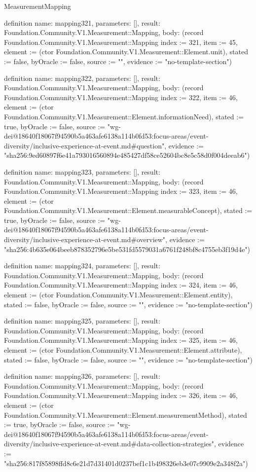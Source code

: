 \begin{lexlean}{MeasurementMapping}
\begin{semanticmodule}
definition{
  name: mapping321,
  parameters: [],
  result: Foundation.Community.V1.Measurement::Mapping,
  body: (record Foundation.Community.V1.Measurement::Mapping {index := 321, item := 45, element := (ctor Foundation.Community.V1.Measurement::Element.unit), stated := false, byOracle := false, source := "", evidence := "no-template-section"})
}

definition{
  name: mapping322,
  parameters: [],
  result: Foundation.Community.V1.Measurement::Mapping,
  body: (record Foundation.Community.V1.Measurement::Mapping {index := 322, item := 46, element := (ctor Foundation.Community.V1.Measurement::Element.informationNeed), stated := true, byOracle := false, source := "wg-dei@18640f18067f94590b5a463afe6138a114b0fd53:focus-areas/event-diversity/inclusive-experience-at-event.md#question", evidence := "sha256:9ed60897f6e41a793016560894e485427df58ce52604bc8e5c58d0f004deeab6"})
}

definition{
  name: mapping323,
  parameters: [],
  result: Foundation.Community.V1.Measurement::Mapping,
  body: (record Foundation.Community.V1.Measurement::Mapping {index := 323, item := 46, element := (ctor Foundation.Community.V1.Measurement::Element.measurableConcept), stated := true, byOracle := false, source := "wg-dei@18640f18067f94590b5a463afe6138a114b0fd53:focus-areas/event-diversity/inclusive-experience-at-event.md#overview", evidence := "sha256:4b635e064beeb878352796e5be531fd5579031a6761f248bf8c4755eb3f19d4e"})
}

definition{
  name: mapping324,
  parameters: [],
  result: Foundation.Community.V1.Measurement::Mapping,
  body: (record Foundation.Community.V1.Measurement::Mapping {index := 324, item := 46, element := (ctor Foundation.Community.V1.Measurement::Element.entity), stated := false, byOracle := false, source := "", evidence := "no-template-section"})
}

definition{
  name: mapping325,
  parameters: [],
  result: Foundation.Community.V1.Measurement::Mapping,
  body: (record Foundation.Community.V1.Measurement::Mapping {index := 325, item := 46, element := (ctor Foundation.Community.V1.Measurement::Element.attribute), stated := false, byOracle := false, source := "", evidence := "no-template-section"})
}

definition{
  name: mapping326,
  parameters: [],
  result: Foundation.Community.V1.Measurement::Mapping,
  body: (record Foundation.Community.V1.Measurement::Mapping {index := 326, item := 46, element := (ctor Foundation.Community.V1.Measurement::Element.measurementMethod), stated := true, byOracle := false, source := "wg-dei@18640f18067f94590b5a463afe6138a114b0fd53:focus-areas/event-diversity/inclusive-experience-at-event.md#data-collection-strategies", evidence := "sha256:817f85898ffd8c6e21d7d31401d0237bef1c1b498326eb3e07c9909e2a348f2a"})
}


\end{semanticmodule}
\end{lexlean}
